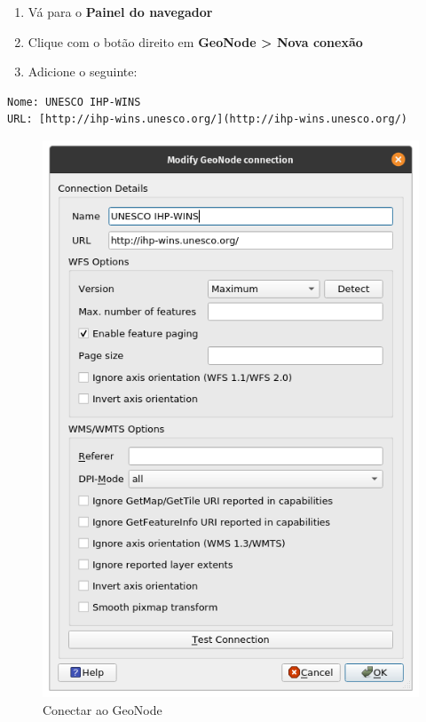 \documentclass[
  portuguese,
]{krantz}
\providecommand{\tightlist}{%
  \setlength{\itemsep}{0pt}\setlength{\parskip}{0pt}}
\begin{document}
\begin{enumerate}
\def\labelenumi{\arabic{enumi}.}
\tightlist
\item
  Vá para o \textbf{Painel do navegador}
\item
  Clique com o botão direito em \textbf{GeoNode \textgreater{} Nova conexão}
\item
  Adicione o seguinte:
\end{enumerate}

\begin{verbatim}
Nome: UNESCO IHP-WINS
URL: [http://ihp-wins.unesco.org/](http://ihp-wins.unesco.org/)
\end{verbatim}

\begin{figure}
\centering
\includegraphics{media/modulo2/connect-geonode.png}
\caption{Conectar ao GeoNode}
\end{figure}
\end{document}
